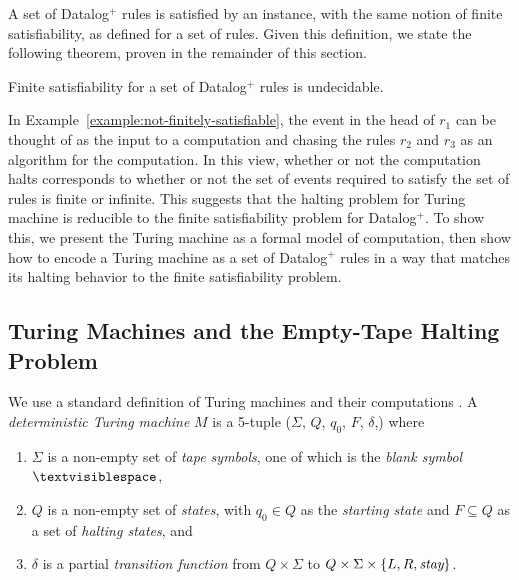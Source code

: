 A set of Datalog$^{+}$ rules
is satisfied by an instance,
with the same notion of finite satisfiability,
as defined for a set of rules.
Given this definition,
we state the following theorem,
proven in the remainder of this section.

\begin{thm}\label{thm:undecidability-extended-Datalog}
Finite satisfiability for a set of Datalog$^{+}$ rules is undecidable.
\end{thm}

In Example~\ref{example:not-finitely-satisfiable},
the event in the head of $r_1$
can be thought of as the input to a computation
and
chasing the rules $r_2$ and $r_3$
as an algorithm for the computation.
In this view,
whether or not the computation halts
corresponds to whether or not
the set of events required to satisfy the set of rules
is finite or infinite.
This suggests that
the halting problem
for Turing machine
is reducible to the finite satisfiability problem
for Datalog$^{+}$.
To show this,
we present the Turing machine
as a formal model of computation,
then 
show how to encode a Turing machine
as a set of Datalog$^{+}$ rules
in a way that matches its halting behavior
to the finite satisfiability problem.

\subsection{Turing Machines and the Empty-Tape Halting Problem}

We use a standard definition of Turing machines
and their computations \cite{GJ79}.
A {\it deterministic Turing machine} $M$
is a 5-tuple ($\Sigma$, $Q$, $q_0$, $F$, $\delta$,)
where
\begin{enumerate}
    \item $\Sigma$ is a non-empty set of {\it tape symbols},
    one of which is the {\it blank symbol} $\blank$,
    \item $Q$ is a non-empty set of {\it states}, with $q_0 \in Q$ as the {\it starting state}
    and $F \subseteq Q$ as a set of {\it halting states}, and
    \item $\delta$ is a partial {\it transition function}
	from $Q \times \Sigma$ to $Q \times \Sigma \times \{ L, R, \mbox{\em stay} \}$.
\end{enumerate}

